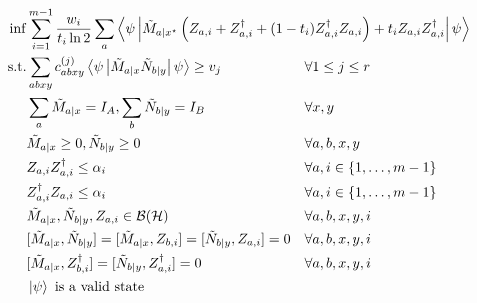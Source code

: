 \documentclass[10pt, a4paper]{article}
\numberwithin{equation}{section} %
\theoremstyle{definition}
\theoremstyle{plain}
\newcommand{\dintv}[2]{\mathopen\{#1,\ldots,#2\mathclose\}}
\newcommand{\?}{\mathrel{?}} %
\newcommand{\angleb}[1]{\left\langle #1 \right\rangle} %
\newcommand{\Hs}{\mathcal{H}} %
\newcommand{\sB}{\mathcal{B}}
\begin{document}
      \begin{equation}
        \begin{aligned}[c]
          \inf & \sum_{i=1}^{m-1} \frac{w_i}{t_i \ln 2} \sum_a \angleb{\psi\left|
          \tilde{M}_{a|x^{\star}} \left( Z_{a,i} + Z_{a,i}^{\dagger} + (1-t_i)  Z_{a,i}^{\dagger}Z_{a,i}\right) + t_i Z_{a,i}Z_{a,i}^{\dagger} \right|\psi} \\
            \text{s.t.} & \begin{aligned}[t] 
          & \sum_{abxy} c^{(j)}_{abxy} \angleb{\psi\left| \tilde{M}_{a|x} \tilde{N}_{b|y} \right|\psi} \geq v_j & & \forall 1 \leq j \leq r \\
          & \sum_{a} \tilde{M}_{a|x} = I_{A}, \sum_{b} \tilde{N}_{b|y} = I_{B} & & \forall x, y \\
          & \tilde{M}_{a|x} \geq 0, \tilde{N}_{b|y} \geq 0 & & \forall a, b, x, y \\
          & Z_{a,i} Z_{a,i}^{\dagger} \leq \alpha_i & & \forall a, i \in \dintv{1}{m-1} \\
          & Z_{a,i}^{\dagger} Z_{a,i} \leq \alpha_i & & \forall a, i \in \dintv{1}{m-1} \\
          & \tilde{M}_{a|x}, \tilde{N}_{b|y}, Z_{a,i} \in \sB(\Hs) & & \forall a, b, x, y, i \\
          & [\tilde{M}_{a|x}, \tilde{N}_{b|y}] = [\tilde{M}_{a|x}, Z_{b,i}] = [\tilde{N}_{b|y}, Z_{a,i}] = 0 & & \forall a, b, x, y, i \\
          & [\tilde{M}_{a|x}, Z_{b,i}^{\dagger}] = [\tilde{N}_{b|y}, Z_{a,i}^{\dagger}] = 0 & & \forall a, b, x, y, i \\
          & \ket{\psi} \text{ is a valid state} & & \\
            \end{aligned}
        \end{aligned}\label{eqn:bff_npa}
      \end{equation}
\end{document}
